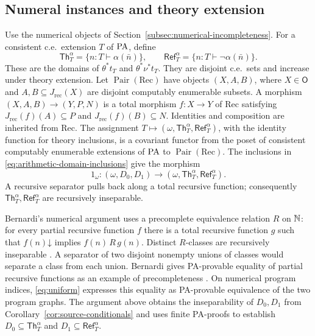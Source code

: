 





\subsection{Numeral instances and theory extension}

Use the numerical objects of Section~\ref{subsec:numerical-incompleteness}.
For a consistent c.e.\ extension $T$ of $\mathrm{PA}$, define
\[
 \mathsf{Th}_T^\alpha=\{n:T\vdash\alpha(\bar n)\},\qquad
 \mathsf{Ref}_T^\alpha=\{n:T\vdash\neg\alpha(\bar n)\}.
\]
These are the domains of $\theta^*t_T$ and $\theta^*\nu^*t_T$.
They are disjoint c.e.\ sets and increase under theory extension.
Let $\operatorname{Pair}(\mathrm{Rec})$ have objects $(X,A,B)$,
where $X\in\mathsf O$ and $A,B\subseteq J_{\mathrm{rec}}(X)$
are disjoint computably enumerable subsets.
A morphism $(X,A,B)\to(Y,P,N)$ is a total morphism $f:X\to Y$
of $\mathrm{Rec}$ satisfying $J_{\mathrm{rec}}(f)(A)\subseteq P$ and
$J_{\mathrm{rec}}(f)(B)\subseteq N$. Identities and composition are inherited
from $\mathrm{Rec}$. The assignment
$T\mapsto(\omega,\mathsf{Th}_T^\alpha,\mathsf{Ref}_T^\alpha)$, with the identity function for theory
inclusions, is a covariant functor from the poset of consistent
computably enumerable extensions of $\mathrm{PA}$ to
$\operatorname{Pair}(\mathrm{Rec})$.
The inclusions in \eqref{eq:arithmetic-domain-inclusions} give the morphism
\[
 1_\omega:(\omega,D_0,D_1)\to
                (\omega,\mathsf{Th}_T^\alpha,\mathsf{Ref}_T^\alpha).
\]
A recursive separator pulls back along a total recursive function;
consequently $\mathsf{Th}_T^\alpha,\mathsf{Ref}_T^\alpha$ are recursively inseparable.

Bernardi's numerical argument uses a precomplete equivalence
relation $R$ on $\mathbb N$: for every partial recursive function $f$
there is a total recursive function $g$ such that
$f(n)\mathord\downarrow$ implies $f(n)\,R\,g(n)$.
Distinct $R$-classes are recursively inseparable
\cite[p.~126, Proposition~2(b)]{Bernardi}. A separator of two disjoint
nonempty unions of classes would separate a class from each union.
Bernardi gives PA-provable equality of partial recursive functions as
an example of precompleteness \cite[p.~125]{Bernardi}. On numerical
program indices, \eqref{eq:uniform} expresses this equality as
PA-provable equivalence of the two program graphs.
The argument above obtains the inseparability of $D_0,D_1$ from
Corollary~\ref{cor:source-conditionals} and uses finite PA-proofs to
establish $D_0\subseteq \mathsf{Th}_T^\alpha$ and $D_1\subseteq \mathsf{Ref}_T^\alpha$.

